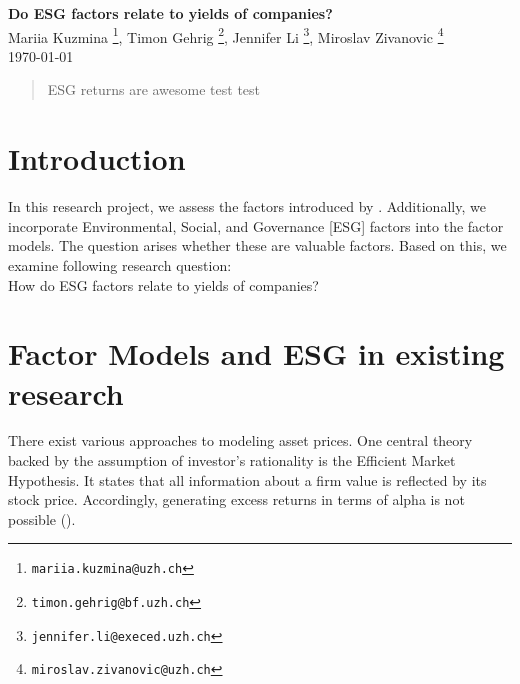 \documentclass[12pt, a4paper]{article}%
\begin{document}
%
%

\begin{titlepage}

\setlength{\topmargin}{0.5cm}

\center

{\Large \bfseries Do ESG factors relate to yields of companies?
}\\[0.5cm] 

Mariia Kuzmina \footnote{\texttt{mariia.kuzmina@uzh.ch}},
Timon Gehrig \footnote{\texttt{timon.gehrig@bf.uzh.ch}},
Jennifer Li \footnote{\texttt{jennifer.li@execed.uzh.ch}},
Miroslav Zivanovic \footnote{\texttt{miroslav.zivanovic@uzh.ch}}\\
\today
\\ [2cm]

\begin{abstract}
ESG returns are awesome test test 
\end{abstract}

\vspace{3cm}



\vfill 
\end{titlepage}

\tableofcontents


%
%
\newpage
\section{Introduction}
In this research project, we assess the factors introduced by \textcite{FamaFrench1992}. Additionally, we incorporate Environmental, Social, and Governance [ESG] factors into the factor models.
The question arises whether these are valuable factors. Based on this, we examine following research question:\\


How do ESG factors relate to yields of companies?

%
%												   
\section{Factor Models and ESG in existing research}
 There exist various approaches to modeling asset prices. One central theory backed by the assumption of investor's rationality is the Efficient Market Hypothesis. It states that all information about a firm value is reflected by its stock price. Accordingly, generating excess returns in terms of alpha is not possible (\textcite{Fama1970}). 
\end{document}
